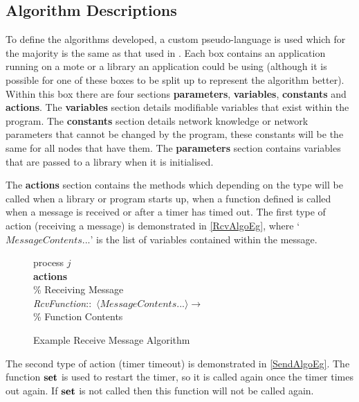 \subsection{Algorithm Descriptions}

To define the algorithms developed, a custom pseudo-language is used which for the majority is the same as that used in \cite{MBCS310}. Each box contains an application running on a mote or a library an application could be using (although it is possible for one of these boxes to be split up to represent the algorithm better). Within this box there are four sections \textbf{parameters}, \textbf{variables}, \textbf{constants} and \textbf{actions}. The \textbf{variables} section details modifiable variables that exist within the program. The \textbf{constants} section details network knowledge or network parameters that cannot be changed by the program, these constants will be the same for all nodes that have them. The \textbf{parameters} section contains variables that are passed to a library when it is initialised.

The \textbf{actions} section contains the methods which depending on the type will be called when a library or program starts up, when a function defined is called when a message is received or after a timer has timed out. The first type of action (receiving a message) is demonstrated in \autoref{RcvAlgoEg}, where `$MessageContents...$' is the list of variables contained within the message.

\begin{figure}[H]
  \centering
  \begin{boxedminipage}{\linewidth}
    \null process $j$\\
    \null \textbf{actions}\\
    \null\qq \% Receiving Message\\
    \null\qq \emph{RcvFunction}::~$\langle MessageContents...\rangle \rightarrow$\\
    \null\qq\qq \% Function Contents\\
  \end{boxedminipage}
  \caption{Example Receive Message Algorithm}
  \label{RcvAlgoEg}
\end{figure}

The second type of action (timer timeout) is demonstrated in \autoref{SendAlgoEg}. The function $\mbox{\textbf{set}}$ is used to restart the timer, so it is called again once the timer times out again. If $\mbox{\textbf{set}}$ is not called then this function will not be called again.

